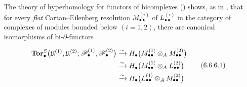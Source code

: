 \begin{env}[6.6.6]
\label{III.6.6.6}
The theory of hyperhomology for functors of bicomplexes
() shows, as in , that for
every \emph{flat} Cartan--Eilenberg resolution
$M_{\bullet\bullet}^{(i)}$ of $L_{\bullet\bullet}^{(i)}$ in the
category of complexes of modules bounded below $(i=1,2)$, there
are canonical isomorphisms of bi-$\partial$-functors
\begin{env}[6.6.6.1]
\label{III.6.6.6.1}
\[
\begin{split}
  \mathbf{Tor}_\bullet^S
  \bigl(
    \mathfrak U^{(1)},\mathfrak U^{(2)};
    \mathscr{P}_\bullet^{(1)},\mathscr{P}_\bullet^{(2)}
  \bigr)
  &\xrightarrow{\sim}
  H_\bullet
  \bigl(
    M_{\bullet\bullet}^{(1)}
    \otimes_A M_{\bullet\bullet}^{(2)}
  \bigr)\\
  &\xrightarrow{\sim}
  H_\bullet
  \bigl(
    M_{\bullet\bullet}^{(1)}
    \otimes_A L_{\bullet\bullet}^{(2)}
  \bigr)\\
  &\xrightarrow{\sim}
  H_\bullet
  \bigl(
    L_{\bullet\bullet}^{(1)}
    \otimes_A M_{\bullet\bullet}^{(2)}
  \bigr).
\end{split}
\tag{6.6.6.1}
\]
\end{env}
\end{env}

